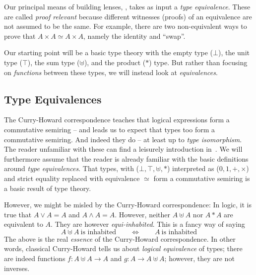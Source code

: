\documentclass[sigplan,review,anonymous]{acmart}\settopmatter{printfolios=true,printccs=false,printacmref=false}
\newcommand{\presumtype}{\uplus}
\newcommand{\preprodtype}{*}
\begin{document}
Our principal means of building lenses, , takes as
input a \emph{type equivalence}.  These are called \emph{proof relevant}
because different witnesses (proofs) of an equivalence are
not assumed to be the same.  For example, there are two
non-equivalent ways to prove that $A × A \simeq A × A$, namely
the identity and ``swap''.

Our starting point will be a basic type theory with the empty
type ($\bot$), the unit type ($\top$), the sum type ($\presumtype$), and
the product ($\preprodtype$) type. But rather than focusing on
\emph{functions} between these types, we will instead look at
\emph{equivalences}.

\subsection{Type Equivalences}

\noindent The Curry-Howard correspondence teaches that logical
expressions form a commutative semiring -- and leads us to
expect that types
too form a commutative semiring. And indeed they do -- at least up to
\emph{type isomorphism}.  The reader unfamiliar with these can
find a leisurely introduction in~\cite{CaretteJamesSabryArxiv}. We
will furthermore assume that the reader is already familiar with
the basic definitions around \emph{type equivalences}.
That types, with ($\bot, \top, \presumtype,
\preprodtype$) interpreted as ($0, 1, +, ×$) and strict
equality replaced with equivalence $\simeq$
form a commutative semiring is a basic result of type theory.

However, we might be misled by the Curry-Howard correspondence:
In logic, it is true that $A \lor A = A$ and
$A \land A = A$. However, neither $A \presumtype A$ nor $A \preprodtype A$ are
equivalent to $A$. They are however \emph{equi-inhabited}. This is
a fancy way of saying
\[ A \presumtype A \ \text{is inhabited} \qquad \Leftrightarrow \qquad A \
  \text{is inhabited} \] The above is the real \textit{essence} of the
Curry-Howard correspondence.  In other words, classical Curry-Howard
tells us about \emph{logical equivalence} of types; there are indeed functions
$f : A \presumtype A \rightarrow A$ and $g : A \rightarrow A \presumtype A$;
however, they are not inverses.
\end{document}
